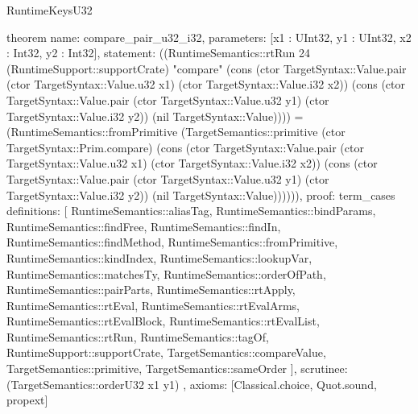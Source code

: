 \begin{lexlean}{RuntimeKeysU32}
\begin{semanticmodule}
theorem{
  name: compare_pair_u32_i32,
  parameters: [x1 : UInt32, y1 : UInt32, x2 : Int32, y2 : Int32],
  statement: ((RuntimeSemantics::rtRun 24 (RuntimeSupport::supportCrate) "compare" (cons (ctor TargetSyntax::Value.pair (ctor TargetSyntax::Value.u32 x1) (ctor TargetSyntax::Value.i32 x2)) (cons (ctor TargetSyntax::Value.pair (ctor TargetSyntax::Value.u32 y1) (ctor TargetSyntax::Value.i32 y2)) (nil TargetSyntax::Value)))) = (RuntimeSemantics::fromPrimitive (TargetSemantics::primitive (ctor TargetSyntax::Prim.compare) (cons (ctor TargetSyntax::Value.pair (ctor TargetSyntax::Value.u32 x1) (ctor TargetSyntax::Value.i32 x2)) (cons (ctor TargetSyntax::Value.pair (ctor TargetSyntax::Value.u32 y1) (ctor TargetSyntax::Value.i32 y2)) (nil TargetSyntax::Value)))))),
  proof: term_cases{
    definitions: [
      RuntimeSemantics::aliasTag,
      RuntimeSemantics::bindParams,
      RuntimeSemantics::findFree,
      RuntimeSemantics::findIn,
      RuntimeSemantics::findMethod,
      RuntimeSemantics::fromPrimitive,
      RuntimeSemantics::kindIndex,
      RuntimeSemantics::lookupVar,
      RuntimeSemantics::matchesTy,
      RuntimeSemantics::orderOfPath,
      RuntimeSemantics::pairParts,
      RuntimeSemantics::rtApply,
      RuntimeSemantics::rtEval,
      RuntimeSemantics::rtEvalArms,
      RuntimeSemantics::rtEvalBlock,
      RuntimeSemantics::rtEvalList,
      RuntimeSemantics::rtRun,
      RuntimeSemantics::tagOf,
      RuntimeSupport::supportCrate,
      TargetSemantics::compareValue,
      TargetSemantics::primitive,
      TargetSemantics::sameOrder
    ],
    scrutinee: (TargetSemantics::orderU32 x1 y1)
  },
  axioms: [Classical.choice, Quot.sound, propext]
}


\end{semanticmodule}
\end{lexlean}
